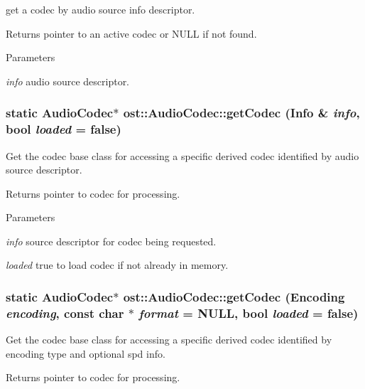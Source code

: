 get a codec by audio source info descriptor. \begin{DoxyReturn}{Returns}
pointer to an active codec or NULL if not found. 
\end{DoxyReturn}

\begin{DoxyParams}{Parameters}
\item[{\em info}]audio source descriptor. \end{DoxyParams}
\subsubsection[{getCodec}]{\setlength{\rightskip}{0pt plus 5cm}static {\bf AudioCodec}$\ast$ ost::AudioCodec::getCodec ({\bf Info} \& {\em info}, \/  bool {\em loaded} = {\ttfamily false})\hspace{0.3cm}{\ttfamily  [static]}}\label{classost_1_1_audio_codec_adaf944bce5fd0ef5559ed660a8b405c3}


Get the codec base class for accessing a specific derived codec identified by audio source descriptor. \begin{DoxyReturn}{Returns}
pointer to codec for processing. 
\end{DoxyReturn}

\begin{DoxyParams}{Parameters}
\item[{\em info}]source descriptor for codec being requested. \item[{\em loaded}]true to load codec if not already in memory. \end{DoxyParams}
\subsubsection[{getCodec}]{\setlength{\rightskip}{0pt plus 5cm}static {\bf AudioCodec}$\ast$ ost::AudioCodec::getCodec ({\bf Encoding} {\em encoding}, \/  const char $\ast$ {\em format} = {\ttfamily NULL}, \/  bool {\em loaded} = {\ttfamily false})\hspace{0.3cm}{\ttfamily  [static]}}\label{classost_1_1_audio_codec_a63e5170162bb09eac8f6d91bb920295f}


Get the codec base class for accessing a specific derived codec identified by encoding type and optional spd info. \begin{DoxyReturn}{Returns}
pointer to codec for processing. 
\end{DoxyReturn}

